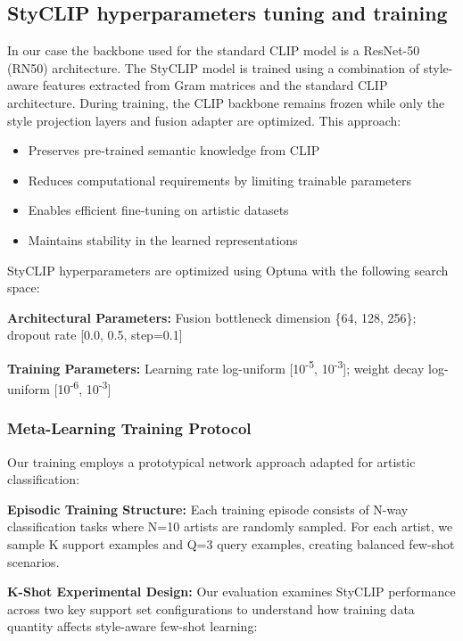 \documentclass[conference,6pt]{IEEEtran}
\begin{document}
\subsection{StyCLIP hyperparameters tuning and training}
In our case the backbone used for the standard CLIP model is a ResNet-50 (RN50) architecture. The StyCLIP model is trained using a combination of style-aware features extracted from Gram matrices and the standard CLIP architecture.
During training, the CLIP backbone remains frozen while only the style projection layers and fusion adapter are optimized. This approach:
\begin{itemize}
    \item Preserves pre-trained semantic knowledge from CLIP
    \item Reduces computational requirements by limiting trainable parameters
    \item Enables efficient fine-tuning on artistic datasets
    \item Maintains stability in the learned representations
\end{itemize}


StyCLIP hyperparameters are optimized using Optuna \cite{Optuna} with the following search space:

\textbf{Architectural Parameters:} Fusion bottleneck dimension \{64, 128, 256\}; dropout rate [0.0, 0.5, step=0.1]

\textbf{Training Parameters:} Learning rate log-uniform [10\textsuperscript{-5}, 10\textsuperscript{-3}]; weight decay log-uniform [10\textsuperscript{-6}, 10\textsuperscript{-3}]

\subsubsection{Meta-Learning Training Protocol}

Our training employs a prototypical network \cite{ProtoNet} approach adapted for artistic classification:

\textbf{Episodic Training Structure:} Each training episode consists of N-way classification tasks where N=10 artists are randomly sampled. For each artist, we sample K support examples and Q=3 query examples, creating balanced few-shot scenarios.

\textbf{K-Shot Experimental Design:} Our evaluation examines StyCLIP performance across two key support set configurations to understand how training data quantity affects style-aware few-shot learning:
\end{document}
